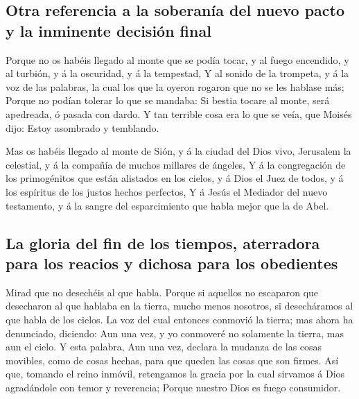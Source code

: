 \hypertarget{otra-referencia-a-la-soberanuxeda-del-nuevo-pacto-y-la-inminente-decisiuxf3n-final}{%
\subsection{Otra referencia a la soberanía del nuevo pacto y la
inminente decisión
final}\label{otra-referencia-a-la-soberanuxeda-del-nuevo-pacto-y-la-inminente-decisiuxf3n-final}}

 Porque no os habéis llegado al monte que se podía tocar,
y al fuego encendido, y al turbión, y á la oscuridad, y á la tempestad,
 Y al sonido de la trompeta, y á la voz de las palabras,
la cual los que la oyeron rogaron que no se les hablase más;
 Porque no podían tolerar lo que se mandaba: Si bestia
tocare al monte, será apedreada, ó pasada con dardo.  Y
tan terrible cosa era lo que se veía, que Moisés dijo: Estoy asombrado y
temblando.

 Mas os habéis llegado al monte de Sión, y á la ciudad
del Dios vivo, Jerusalem la celestial, y á la compañía de muchos
millares de ángeles,  Y á la congregación de los
primogénitos que están alistados en los cielos, y á Dios el Juez de
todos, y á los espíritus de los justos hechos perfectos, 
Y á Jesús el Mediador del nuevo testamento, y á la sangre del
esparcimiento que habla mejor que la de Abel.

\hypertarget{la-gloria-del-fin-de-los-tiempos-aterradora-para-los-reacios-y-dichosa-para-los-obedientes}{%
\subsection{La gloria del fin de los tiempos, aterradora para los
reacios y dichosa para los
obedientes}\label{la-gloria-del-fin-de-los-tiempos-aterradora-para-los-reacios-y-dichosa-para-los-obedientes}}

 Mirad que no desechéis al que habla. Porque si aquellos
no escaparon que desecharon al que hablaba en la tierra, mucho menos
nosotros, si desecháramos al que habla de los cielos.  La
voz del cual entonces conmovió la tierra; mas ahora ha denunciado,
diciendo: Aun una vez, y yo conmoveré no solamente la tierra, mas aun el
cielo.  Y esta palabra, Aun una vez, declara la mudanza
de las cosas movibles, como de cosas hechas, para que queden las cosas
que son firmes.  Así que, tomando el reino inmóvil,
retengamos la gracia por la cual sirvamos á Dios agradándole con temor y
reverencia;  Porque nuestro Dios es fuego consumidor.

